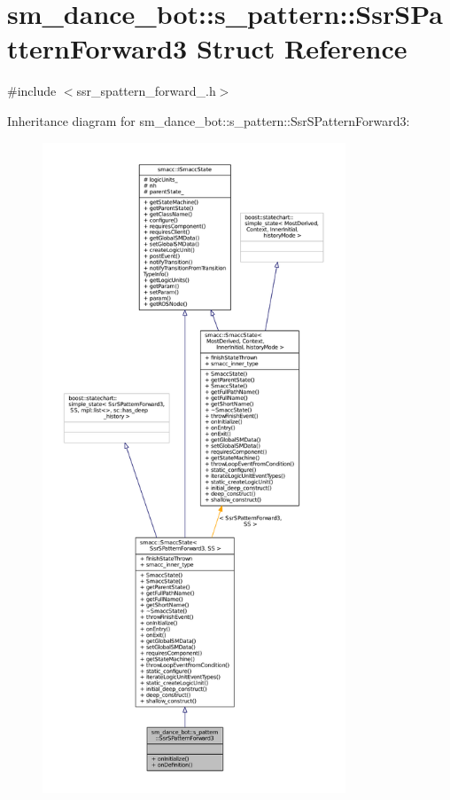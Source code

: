\hypertarget{structsm__dance__bot_1_1s__pattern_1_1SsrSPatternForward3}{}\section{sm\+\_\+dance\+\_\+bot\+:\+:s\+\_\+pattern\+:\+:Ssr\+S\+Pattern\+Forward3 Struct Reference}
\label{structsm__dance__bot_1_1s__pattern_1_1SsrSPatternForward3}


{\ttfamily \#include $<$ssr\+\_\+spattern\+\_\+forward\+\_.\+h$>$}



Inheritance diagram for sm\+\_\+dance\+\_\+bot\+:\+:s\+\_\+pattern\+:\+:Ssr\+S\+Pattern\+Forward3\+:
\nopagebreak
\begin{figure}[H]
\begin{center}
\leavevmode
\includegraphics[height=550pt]{structsm__dance__bot_1_1s__pattern_1_1SsrSPatternForward3__inherit__graph}
\end{center}
\end{figure}



